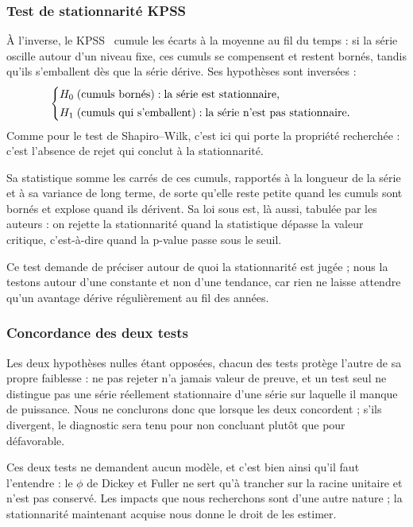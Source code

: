 \subsubsection*{Test de stationnarité KPSS}

À l'inverse, le KPSS~\cite{kpss1992} cumule les écarts à la moyenne au fil du temps : si la
série oscille autour d'un niveau fixe, ces cumuls se compensent et restent
bornés, tandis qu'ils s'emballent dès que la série dérive. Ses hypothèses
sont inversées :
\[
  \begin{cases}
    H_0 \;(\text{cumuls bornés}) : \text{la série est stationnaire,}\\[2pt]
    H_1 \;(\text{cumuls qui s'emballent}) : \text{la série n'est pas stationnaire.}
  \end{cases}
\]
Comme pour le test de Shapiro--Wilk, c'est ici \Hzero{} qui porte la propriété
recherchée : c'est l'absence de rejet qui conclut à la stationnarité.

Sa statistique somme les carrés de ces cumuls, rapportés à la longueur de la
série et à sa variance de long terme, de sorte qu'elle reste petite quand les
cumuls sont bornés et explose quand ils dérivent. Sa loi sous \Hzero{} est,
là aussi, tabulée par les auteurs : on rejette la stationnarité quand la
statistique dépasse la valeur critique, c'est-à-dire quand la p-value passe
sous le seuil.

Ce test demande de préciser autour de quoi la stationnarité est jugée ; nous
la testons autour d'une constante et non d'une tendance, car rien ne laisse
attendre qu'un avantage dérive régulièrement au fil des années.

\subsubsection*{Concordance des deux tests}

Les deux hypothèses nulles étant opposées, chacun des tests protège l'autre de
sa propre faiblesse : ne pas rejeter n'a jamais valeur de preuve, et un test
seul ne distingue pas une série réellement stationnaire d'une série sur
laquelle il manque de puissance. Nous ne conclurons donc que lorsque les deux
concordent ; s'ils divergent, le diagnostic sera tenu pour non concluant
plutôt que pour défavorable.

Ces deux tests ne demandent aucun modèle, et c'est bien ainsi qu'il faut
l'entendre : le \(\phi\) de Dickey et Fuller ne sert qu'à trancher sur la
racine unitaire et n'est pas conservé. Les impacts que nous recherchons sont
d'une autre nature ; la stationnarité maintenant acquise nous donne le droit
de les estimer.

